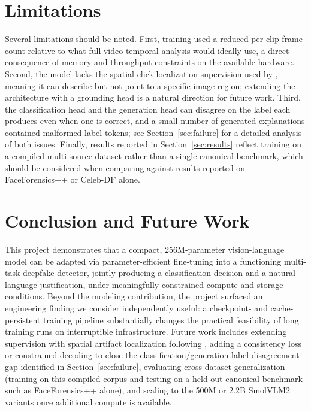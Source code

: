 \documentclass[acmsmall,review=false]{acmart}
\begin{document}
\section{Limitations}
\label{sec:limitations}

Several limitations should be noted. First, training used a reduced per-clip
frame count relative to what full-video temporal analysis would ideally use,
a direct consequence of memory and throughput constraints on the available
hardware. Second, the model lacks the spatial click-localization supervision
used by \citet{hondru2025exddv}, meaning it can describe but not point to a
specific image region; extending the architecture with a grounding head is a
natural direction for future work. Third, the classification head and the
generation head can disagree on the label each produces even when one is
correct, and a small number of generated explanations contained malformed
label tokens; see Section~\ref{sec:failure} for a detailed analysis of both
issues. Finally, results reported in Section~\ref{sec:results} reflect
training on a compiled multi-source dataset rather than a single canonical
benchmark, which should be considered when comparing against results reported
on FaceForensics++ or Celeb-DF alone.

\section{Conclusion and Future Work}
\label{sec:conclusion}

This project demonstrates that a compact, 256M-parameter vision-language model
can be adapted via parameter-efficient fine-tuning into a functioning
multi-task deepfake detector, jointly producing a classification decision and
a natural-language justification, under meaningfully constrained compute and
storage conditions. Beyond the modeling contribution, the project surfaced an
engineering finding we consider independently useful: a checkpoint- and
cache-persistent training pipeline substantially changes the practical
feasibility of long training runs on interruptible infrastructure. Future
work includes extending
supervision with spatial artifact localization following
\citet{hondru2025exddv}, adding a consistency loss or constrained decoding to
close the classification/generation label-disagreement gap identified in
Section~\ref{sec:failure}, evaluating cross-dataset generalization (training on
this compiled corpus and testing on a held-out canonical benchmark such as
FaceForensics++ alone), and scaling to the 500M or 2.2B SmolVLM2 variants once
additional compute is available.
\end{document}
